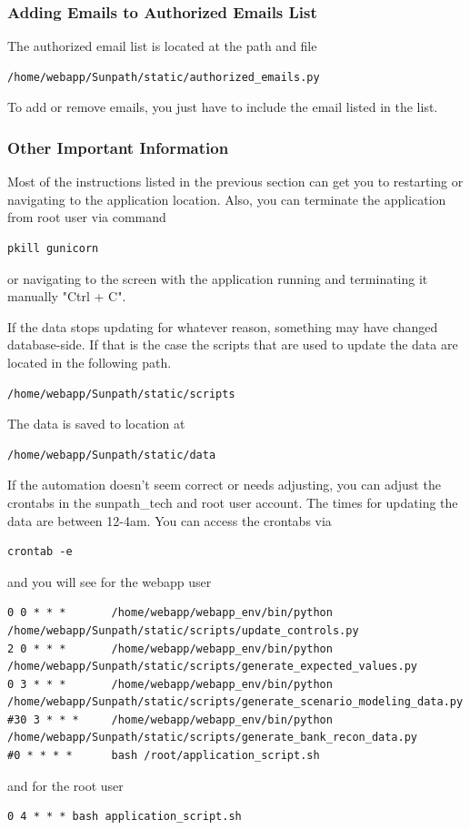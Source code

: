 \documentclass[titlepage]{article}
\begin{document}
\subsubsection{Adding Emails to Authorized Emails List}
The authorized email list is located at the path and file
\begin{verbatim}
/home/webapp/Sunpath/static/authorized_emails.py
\end{verbatim}
To add or remove emails, you just have to include the email listed in the list. 

\subsubsection{Other Important Information}
Most of the instructions listed in the previous section can get you to restarting or navigating to the application location. Also, you can terminate the application from root user via command 
\begin{verbatim}
pkill gunicorn
\end{verbatim}
or navigating to the screen with the application running and terminating it manually "Ctrl + C". 

If the data stops updating for whatever reason, something may have changed database-side. If that is the case the scripts that are used to update the data are located in the following path.
\begin{verbatim}
/home/webapp/Sunpath/static/scripts
\end{verbatim}
The data is saved to location at 
\begin{verbatim}
/home/webapp/Sunpath/static/data
\end{verbatim}

If the automation doesn't seem correct or needs adjusting, you can adjust the crontabs in the sunpath\_tech and root user account. The times for updating the data are between 12-4am. You can access the crontabs via 
\begin{verbatim}
crontab -e
\end{verbatim}
and you will see for the webapp user
\begin{verbatim}
0 0 * * *       /home/webapp/webapp_env/bin/python 
/home/webapp/Sunpath/static/scripts/update_controls.py
2 0 * * *       /home/webapp/webapp_env/bin/python 
/home/webapp/Sunpath/static/scripts/generate_expected_values.py
0 3 * * *       /home/webapp/webapp_env/bin/python 
/home/webapp/Sunpath/static/scripts/generate_scenario_modeling_data.py
#30 3 * * *     /home/webapp/webapp_env/bin/python 
/home/webapp/Sunpath/static/scripts/generate_bank_recon_data.py
#0 * * * *      bash /root/application_script.sh 
\end{verbatim}
and for the root user
\begin{verbatim}
0 4 * * * bash application_script.sh
\end{verbatim}
\end{document}
